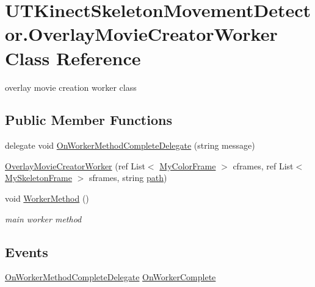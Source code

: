 \hypertarget{classUTKinectSkeletonMovementDetector_1_1OverlayMovieCreatorWorker}{\section{U\-T\-Kinect\-Skeleton\-Movement\-Detector.\-Overlay\-Movie\-Creator\-Worker Class Reference}
\label{classUTKinectSkeletonMovementDetector_1_1OverlayMovieCreatorWorker}
}


overlay movie creation worker class  


\subsection*{Public Member Functions}
\begin{DoxyCompactItemize}
\item 
delegate void \hyperlink{classUTKinectSkeletonMovementDetector_1_1OverlayMovieCreatorWorker_a8f0c6db2f98bfa154472f03a57f57965}{On\-Worker\-Method\-Complete\-Delegate} (string message)
\item 
\hyperlink{classUTKinectSkeletonMovementDetector_1_1OverlayMovieCreatorWorker_a3bd9c053c3557b128d9eddfd5661662e}{Overlay\-Movie\-Creator\-Worker} (ref List$<$ \hyperlink{classUTKinectSkeletonMovementDetector_1_1MyColorFrame}{My\-Color\-Frame} $>$ cframes, ref List$<$ \hyperlink{classUTKinectSkeletonMovementDetector_1_1MySkeletonFrame}{My\-Skeleton\-Frame} $>$ sframes, string \hyperlink{classUTKinectSkeletonMovementDetector_1_1OverlayMovieCreatorWorker_aea3e1a17daf934d675f8bdc54b08bb3a}{path})
\item 
void \hyperlink{classUTKinectSkeletonMovementDetector_1_1OverlayMovieCreatorWorker_aebd9b99b693ca67fc6d58e68828899dd}{Worker\-Method} ()
\begin{DoxyCompactList}\small\item\em main worker method \end{DoxyCompactList}\end{DoxyCompactItemize}
\subsection*{Events}
\begin{DoxyCompactItemize}
\item 
\hyperlink{classUTKinectSkeletonMovementDetector_1_1OverlayMovieCreatorWorker_a8f0c6db2f98bfa154472f03a57f57965}{On\-Worker\-Method\-Complete\-Delegate} \hyperlink{classUTKinectSkeletonMovementDetector_1_1OverlayMovieCreatorWorker_a8287ec8e540ee2d64881ae833d70df20}{On\-Worker\-Complete}
\end{DoxyCompactItemize}
